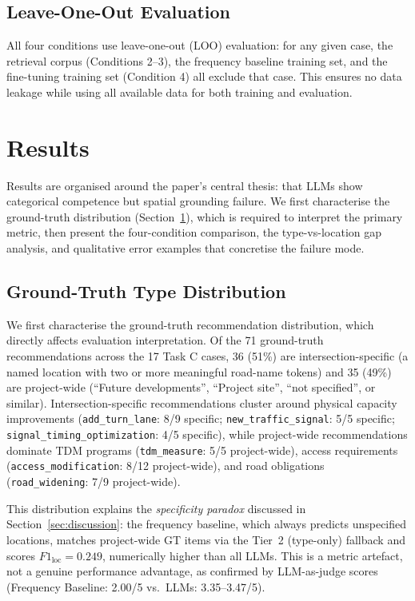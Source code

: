 \documentclass[preprint,12pt]{elsarticle}
\begin{document}
\subsection{Leave-One-Out Evaluation}

All four conditions use leave-one-out (LOO) evaluation: for any given case,
the retrieval corpus (Conditions 2--3), the frequency baseline training set,
and the fine-tuning training set (Condition 4) all exclude that case.
This ensures no data leakage while using all available data for both
training and evaluation.

\section{Results}
\label{sec:results}

Results are organised around the paper's central thesis: that LLMs show
categorical competence but spatial grounding failure.
We first characterise the ground-truth distribution (Section~\ref{sec:results}),
which is required to interpret the primary metric, then present the
four-condition comparison, the type-vs-location gap analysis,
and qualitative error examples that concretise the failure mode.

\subsection{Ground-Truth Type Distribution}

We first characterise the ground-truth recommendation distribution,
which directly affects evaluation interpretation.
Of the 71 ground-truth recommendations across the 17 Task C cases,
36 (51\%) are intersection-specific (a named location with two or more
meaningful road-name tokens) and 35 (49\%) are project-wide
(``Future developments'', ``Project site'', ``not specified'', or similar).
Intersection-specific recommendations cluster around physical capacity
improvements (\texttt{add\_turn\_lane}: 8/9 specific;
\texttt{new\_traffic\_signal}: 5/5 specific;
\texttt{signal\_timing\_optimization}: 4/5 specific),
while project-wide recommendations dominate TDM programs
(\texttt{tdm\_measure}: 5/5 project-wide),
access requirements (\texttt{access\_modification}: 8/12 project-wide),
and road obligations (\texttt{road\_widening}: 7/9 project-wide).

This distribution explains the \emph{specificity paradox} discussed in
Section~\ref{sec:discussion}: the frequency baseline, which always
predicts unspecified locations, matches project-wide GT items via
the Tier~2 (type-only) fallback and scores $F1_\text{loc} = 0.249$,
numerically higher than all LLMs.
This is a metric artefact, not a genuine performance advantage, as
confirmed by LLM-as-judge scores (Frequency Baseline: 2.00/5 vs.\ LLMs: 3.35--3.47/5).
\end{document}
